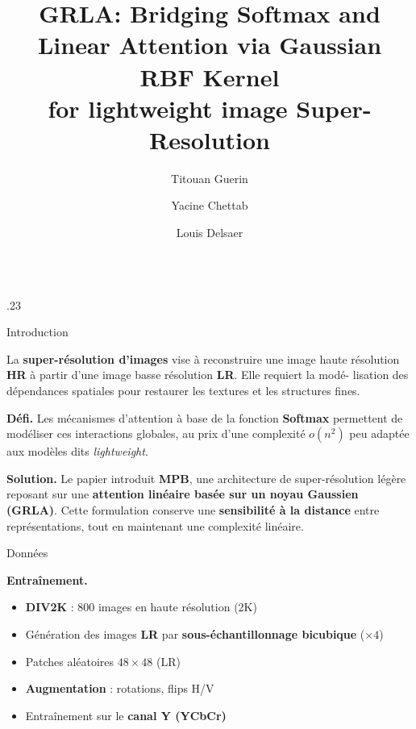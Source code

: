\documentclass{beamer}
\author{Titouan Guerin \and  Yacine Chettab \and Louis Delsaer}
\title{GRLA: Bridging Softmax and Linear Attention via Gaussian RBF Kernel \\for lightweight image Super-Resolution}
\institute{Sorbonne Université}
\newcommand{\highlight}[1]{\textcolor{iclrblue}{\textbf{#1}}}
\begin{document}
\begin{frame}
\begin{columns}[T]


\begin{column}{.23\textwidth}
\begin{minipage}[t][\textheight][t]{\linewidth}

\begin{block}{Introduction}


La \textbf{super-résolution d’images} vise à reconstruire une image
haute résolution \textbf{HR} à partir d’une image basse résolution \textbf{LR}. Elle requiert la modé- lisation des dépendances spatiales pour restaurer les textures et les structures fines.

\par\vspace{0.5em}

\highlight{Défi.}
Les mécanismes d’attention à base de la fonction \textbf{Softmax} permettent de modéliser ces interactions globales,
au prix d’une complexité $o(n^2)$ peu adaptée aux modèles dits \textit{lightweight}.
\par\vspace{0.5em}

\highlight{Solution.}
Le papier introduit \textbf{MPB}, une architecture de super-résolution légère  reposant sur une \textbf{attention linéaire basée sur un noyau Gaussien (GRLA)}. Cette formulation conserve une \textbf{sensibilité à la distance} entre représentations, tout en maintenant une complexité linéaire.  



\end{block}





\begin{block}{Données}

\highlight{Entraînement.}
\par\vspace{0.2em}
\begin{itemize}
    \item \textbf{DIV2K} : 800 images en haute résolution (2K)
    \item Génération des images \textbf{LR} par \textbf{sous-échantillonnage bicubique} ($\times4$)
    \item Patches aléatoires $48 \times 48$ (LR)
    \item \textbf{Augmentation} : rotations, flips H/V
    \item Entraînement sur le \textbf{canal Y (YCbCr)}
\end{itemize}


\end{block}
\end{minipage}
\end{column}
\end{columns}
\end{frame}
\end{document}
